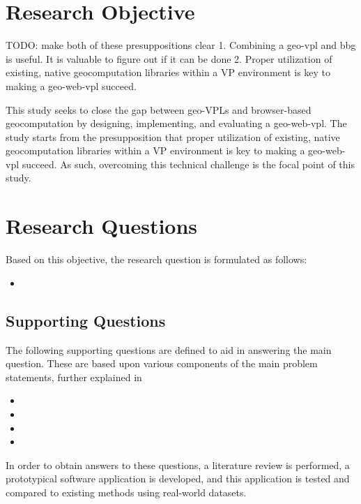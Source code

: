 
\section{Research Objective}

\begin{note}
TODO: make both of these presuppositions clear
1. Combining a geo-vpl and bbg is useful. It is valuable to figure out if it can be done
2. Proper utilization of existing, native geocomputation libraries within a VP environment is key to making a geo-web-vpl succeed. 
\end{note}

This study seeks to close the gap between geo-VPLs and browser-based geocomputation by designing, implementing, and evaluating a \ac{geo-web-vpl}.
The study starts from the presupposition that proper utilization of existing, native geocomputation libraries within a VP environment is key to making a geo-web-vpl succeed. 
As such, overcoming this technical challenge is the focal point of this study. 

\section{Research Questions}
Based on this objective, the research question is formulated as follows: 
\begin{itemize}[ ]
  \item \myMainRQ
\end{itemize}

\subsection*{Supporting Questions}
The following supporting questions are defined to aid in answering the main question.
These are based upon various components of the main problem statements, further explained in 
\begin{itemize}[-]
  \item \mySubRQOne
  \item \mySubRQTwo
  \item \mySubRQThree
  \item \mySubRQFour
\end{itemize}
In order to obtain answers to these questions, a literature review is performed,
a prototypical software application is developed, 
and this application is tested and compared to existing methods using real-world datasets.


